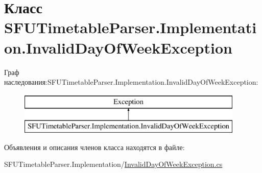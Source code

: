 \hypertarget{class_s_f_u_timetable_parser_1_1_implementation_1_1_invalid_day_of_week_exception}{}\section{Класс S\+F\+U\+Timetable\+Parser.\+Implementation.\+Invalid\+Day\+Of\+Week\+Exception}
\label{class_s_f_u_timetable_parser_1_1_implementation_1_1_invalid_day_of_week_exception}
Граф наследования\+:S\+F\+U\+Timetable\+Parser.\+Implementation.\+Invalid\+Day\+Of\+Week\+Exception\+:\begin{figure}[H]
\begin{center}
\leavevmode
\includegraphics[height=2.000000cm]{class_s_f_u_timetable_parser_1_1_implementation_1_1_invalid_day_of_week_exception}
\end{center}
\end{figure}


Объявления и описания членов класса находятся в файле\+:\begin{DoxyCompactItemize}
\item 
S\+F\+U\+Timetable\+Parser.\+Implementation/\hyperlink{_invalid_day_of_week_exception_8cs}{Invalid\+Day\+Of\+Week\+Exception.\+cs}\end{DoxyCompactItemize}
